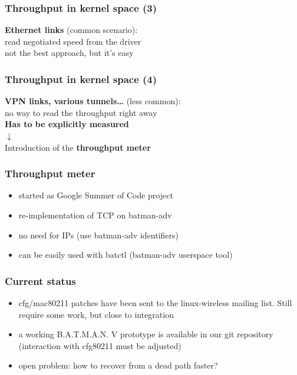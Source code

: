 \documentclass[slidestop]{beamer}
\begin{document}
\begin{frame}[c]
	\frametitle{Throughput in kernel space (3)}
	\begin{center}
	\textbf{Ethernet links} (common scenario):\\
	read negotiated speed from the driver\\[0.5cm]
	\pause
	not the best approach, but it's easy\\[0.5cm]
	\end{center}
\end{frame}

\begin{frame}
	\frametitle{Throughput in kernel space (4)}
	\begin{center}
	\textbf{VPN links, various tunnels\dots} (less common):\\
	no way to read the throughput right away\\[0.1cm]
	\textbf{Has to be explicitly measured}\\[0.5cm]
	\pause
	$\downarrow$\\[0.5cm]
	Introduction of the \textbf{throughput meter}
	\end{center}
\end{frame}

\begin{frame}[c]
	\frametitle{Throughput meter}
	\begin{itemize}
		\item started as Google Summer of Code project
		\item re-implementation of TCP on batman-adv
		\item no need for IPs (use batman-adv identifiers)
		\item can be easily used with batctl (batman-adv userspace tool)
	\end{itemize}
\end{frame}

\begin{frame}[c]
	\frametitle{Current status}
	\begin{itemize}
		\item cfg/mac80211 patches have been sent to the linux-wireless
			mailing list. Still require some work, but close to
			integration
		\item a working B.A.T.M.A.N. V prototype is available in our git
			repository (interaction with cfg80211 must be adjusted)
		\item open problem: how to recover from a dead path faster?
	\end{itemize}
\end{frame}
\end{document}
